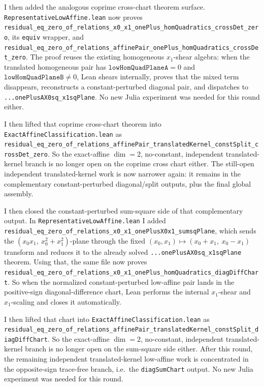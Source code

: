\documentclass[11pt]{article}
\begin{document}
I then added the analogous coprime cross-chart theorem surface.
\texttt{RepresentativeLowAffine.lean} now proves
\texttt{residual\_eq\_zero\_of\_relations\_x0\_x1\_onePlus\_homQuadratics\_crossDet\_zero},
its \texttt{equiv} wrapper, and
\texttt{residual\_eq\_zero\_of\_relations\_affinePair\_onePlus\_homQuadratics\_crossDet\_zero}.
The proof reuses the existing homogeneous \(x_1\)-shear algebra: when the
translated homogeneous pair has \(\texttt{lowHomQuadPlaneA}=0\) and
\(\texttt{lowHomQuadPlaneB}\neq 0\), Lean shears internally, proves that the
mixed term disappears, reconstructs a constant-perturbed diagonal pair, and
dispatches to \texttt{...onePlusAX0sq\_x1sqPlane}. No new Julia experiment was
needed for this round either.

I then lifted that coprime cross-chart theorem into
\texttt{ExactAffineClassification.lean} as
\texttt{residual\_eq\_zero\_of\_relations\_affinePair\_translatedKernel\_constSplit\_crossDet\_zero}.
So the exact-affine \(\dim = 2\), no-constant, independent translated-kernel
branch is no longer open on the coprime cross chart either. The still-open
independent translated-kernel work is now narrower again: it remains in the
complementary constant-perturbed diagonal/split outputs, plus the final global
assembly.

I then closed the constant-perturbed sum-square side of that complementary
output. In \texttt{RepresentativeLowAffine.lean} I added
\texttt{residual\_eq\_zero\_of\_relations\_x0\_x1\_onePlusX0x1\_sumsqPlane},
which sends the \((x_0x_1,\ x_0^2+x_1^2)\)-plane through the fixed
\((x_0,x_1) \mapsto (x_0+x_1,\ x_0-x_1)\) transform and reduces it to the
already solved \texttt{...onePlusAX0sq\_x1sqPlane} theorem. Using that, the
same file now proves
\texttt{residual\_eq\_zero\_of\_relations\_x0\_x1\_onePlus\_homQuadratics\_diagDiffChart}.
So when the normalized constant-perturbed low-affine pair lands in the
positive-sign diagonal-difference chart, Lean performs the internal
\(x_1\)-shear and \(x_1\)-scaling and closes it automatically.

I then lifted that chart into \texttt{ExactAffineClassification.lean} as
\texttt{residual\_eq\_zero\_of\_relations\_affinePair\_translatedKernel\_constSplit\_diagDiffChart}.
So the exact-affine \(\dim = 2\), no-constant, independent translated-kernel
branch is no longer open on the sum-square side either. After this round, the
remaining independent translated-kernel low-affine work is concentrated in the
opposite-sign trace-free branch, i.e.\ the \texttt{diagSumChart} output. No
new Julia experiment was needed for this round.
\end{document}
